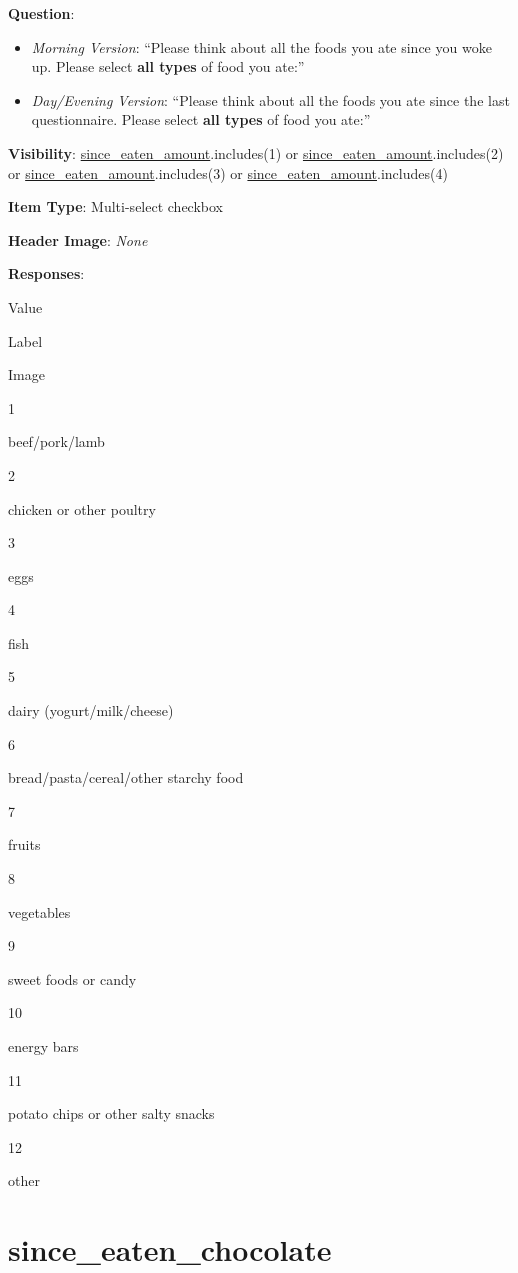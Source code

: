 \documentclass[]{book}
\providecommand{\tightlist}{%
  \setlength{\itemsep}{0pt}\setlength{\parskip}{0pt}}
\begin{document}
\textbf{Question}:

\begin{itemize}
\tightlist
\item
  \emph{Morning Version}: ``Please think about all the foods you ate since you woke up. Please select \textbf{all types} of food you ate:''
\item
  \emph{Day/Evening Version}: ``Please think about all the foods you ate since the last questionnaire. Please select \textbf{all types} of food you ate:''
\end{itemize}

\textbf{Visibility}: \protect\hyperlink{since_eaten_amount}{since\_eaten\_amount}.includes(1) or \protect\hyperlink{since_eaten_amount}{since\_eaten\_amount}.includes(2) or \protect\hyperlink{since_eaten_amount}{since\_eaten\_amount}.includes(3) or \protect\hyperlink{since_eaten_amount}{since\_eaten\_amount}.includes(4)

\textbf{Item Type}: Multi-select checkbox

\textbf{Header Image}: \emph{None}

\textbf{Responses}:

Value

Label

Image

1

beef/pork/lamb

2

chicken or other poultry

3

eggs

4

fish

5

dairy (yogurt/milk/cheese)

6

bread/pasta/cereal/other starchy food

7

fruits

8

vegetables

9

sweet foods or candy

10

energy bars

11

potato chips or other salty snacks

12

other

\hypertarget{since_eaten_chocolate}{%
\section{since\_eaten\_chocolate}\label{since_eaten_chocolate}}
\end{document}
